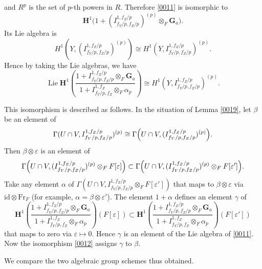 \documentclass{amsart}
\theoremstyle{remark}
\numberwithin{equation}{section}
\newcommand{\tensor}{\mathbin{\otimes}}
\newcommand{\id}{\mathrm{id}}
\newcommand{\Ga}{\mathbf{G}_{a}}
\newcommand{\alg}[1]{\mathbf{#1}}
\newcommand{\Frob}{\mathrm{Fr}}
\DeclareMathOperator{\Lie}{Lie}
\begin{document}
and $R^{p}$ is the set of $p$-th powers in $R$.
Therefore \eqref{0011} is isomorphic to
	\[
		\alg{H}^{1} \bigl(
			1 + (I^{1, f_{Z} / p}_{f_{Y} / p, f_{Z} / p})^{(p)} \tensor_{F} \Ga
		\bigr).
	\]
Its Lie algebra is
	\[
			H^{1}(Y, (I^{1, f_{Z} / p}_{f_{Y} / p, f_{Z} / p})^{(p)})
		\cong
			H^{1}(Y, I^{1, f_{Z} / p}_{f_{Y} / p, f_{Z} / p})^{(p)}.
	\]
Hence by taking the Lie algebras, we have
	\begin{equation} \label{0012}
			\Lie
			\alg{H}^{1} \left(
				\frac{
					1 + I^{1, f_{Z} / p}_{f_{Y} / p, f_{Z} / p} \tensor_{F} \Ga
				}{
					1 + I^{1, f_{Z}}_{f_{Y} / p, f_{Z}} \tensor_{F} \alpha_{p}
				}
			\right)
		\cong
			H^{1}(Y, I^{1, f_{Z} / p}_{f_{Y} / p, f_{Z} / p})^{(p)}.
	\end{equation}

This isomorphism is described as follows.
In the situation of Lemma \ref{0019},
let $\beta$ be an element of
	\[
			\Gamma(U \cap V, I^{1, f_{Z} / p}_{f_{Y} / p, f_{Z} / p})^{(p)}
		\cong
			\Gamma \Bigl(
				U \cap V,
				(I^{1, f_{Z} / p}_{f_{Y} / p, f_{Z} / p})^{(p)}
			\Bigr).
	\]
Then $\beta \tensor \varepsilon$ is an element of
	\[
			\Gamma \Bigl(
				U \cap V,
					(I^{1, f_{Z} / p}_{f_{Y} / p, f_{Z} / p})^{(p)}
				\tensor_{F}
					F[\varepsilon]
			\Bigr)
		\subset
			\Gamma \Bigl(
				U \cap V,
					(I^{1, f_{Z} / p}_{f_{Y} / p, f_{Z} / p})^{(p)}
				\tensor_{F}
					F[\varepsilon']
			\Bigr).
	\]
Take any element $\alpha$ of
$\Gamma(U \cap V, I^{1, f_{Z} / p}_{f_{Y} / p, f_{Z} / p} \tensor_{F} F[\varepsilon'])$
that maps to $\beta \tensor \varepsilon$ via $\id \tensor \Frob_{F}$
(for example, $\alpha = \beta \tensor \varepsilon'$).
The element $1 + \alpha$ defines an element $\gamma$ of
	\[
			\alg{H}^{1} \left(
				\frac{
					1 + I^{1, f_{Z} / p}_{f_{Y} / p, f_{Z} / p} \tensor_{F} \Ga
				}{
					1 + I^{1, f_{Z}}_{f_{Y} / p, f_{Z}} \tensor_{F} \alpha_{p}
				}
			\right)(F[\varepsilon])
		\subset
			\alg{H}^{1} \left(
				\frac{
					1 + I^{1, f_{Z} / p}_{f_{Y} / p, f_{Z} / p} \tensor_{F} \Ga
				}{
					1 + I^{1, f_{Z}}_{f_{Y} / p, f_{Z}} \tensor_{F} \alpha_{p}
				}
			\right)(F[\varepsilon'])
	\]
that maps to zero via $\varepsilon \mapsto 0$.
Hence $\gamma$ is an element of the Lie algebra of \eqref{0011}.
Now the isomorphism \eqref{0012} assigns $\gamma$ to $\beta$.

We compare the two algebraic group schemes thus obtained.
\end{document}
